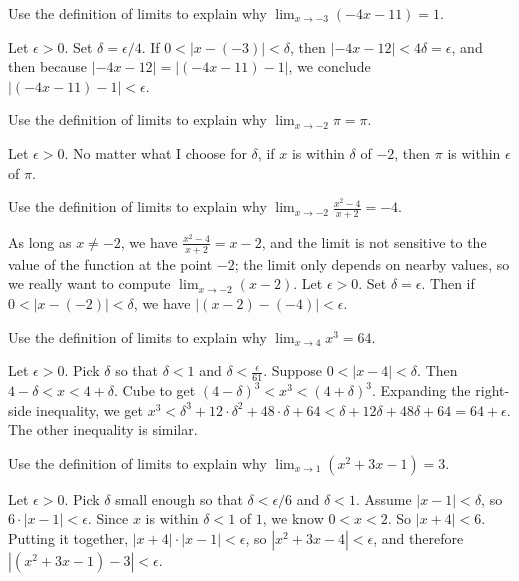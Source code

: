 \begin{exercises}
\begin{exercise} 
Use the definition of limits to explain why $\lim_{x\to -3} (-4x-11)
= 1$.
\begin{answer}
  Let $\epsilon > 0$.  Set $\delta = \epsilon/4$.  If $0 < |x - (-3)| < \delta$, then $|-4x - 12| < 4 \delta = \epsilon$, and then because $|-4x - 12| = |(-4x - 11) - 1|$, we conclude $|(-4x - 11) - 1| < \epsilon$.
\end{answer}
\end{exercise}

\begin{exercise} 
Use the definition of limits to explain why $\lim_{x\to -2} \pi = \pi$.
\begin{answer}
  Let $\epsilon > 0$.  No matter what I choose for $\delta$, if $x$ is within $\delta$ of $-2$, then $\pi$ is within $\epsilon$ of $\pi$.
\end{answer}
\end{exercise}

\begin{exercise} 
Use the definition of limits to explain why $\lim_{x\to -2} \frac{x^2-4}{x+2} = -4$.
\begin{answer}
  As long as $x \neq -2$, we have $\frac{x^2-4}{x+2} = x-2$, and the limit is not sensitive to the value of the function at the point $-2$; the limit only depends on nearby values, so we really want to compute $\lim_{x \to -2} (x-2)$.  Let $\epsilon > 0$.  Set $\delta = \epsilon$.  Then if $0 < |x - (-2)| < \delta$, we have $|(x - 2) - (-4)| < \epsilon$.
\end{answer}
\end{exercise}

\begin{exercise} 
Use the definition of limits to explain why $\lim_{x\to 4} x^3 = 64$.
\begin{answer}
  Let $\epsilon > 0$.   Pick $\delta$ so that $\delta < 1$ and $\delta < \frac{\epsilon}{61}$.  Suppose $0 < |x-4| < \delta$.  Then $4 - \delta < x < 4 + \delta$.  Cube to get $\left( 4 - \delta \right)^3 < x^3 < \left( 4 + \delta \right)^3$.  Expanding the right-side inequality, we get $x^3 < \delta^3 + 12\cdot\delta^2 + 48\cdot\delta + 64 < \delta + 12 \delta + 48 \delta + 64 = 64 + \epsilon$.  The other inequality is similar.
\end{answer}
\end{exercise}

\begin{exercise} 
Use the definition of limits to explain why $\lim_{x\to 1} (x^2+3x-1) = 3$.
\begin{answer}
  Let $\epsilon > 0$.  Pick $\delta$ small enough so that $\delta < \epsilon / 6$ and $\delta < 1$.  Assume $|x - 1| < \delta$, so $6 \cdot |x - 1| < \epsilon$.  Since $x$ is within $\delta < 1$ of $1$, we know $0 < x < 2$.  So $|x+4| < 6$.  Putting it together, $|x+4| \cdot |x-1| < \epsilon$, so $|x^2 + 3x - 4| < \epsilon$, and therefore $|(x^2 + 3x - 1) - 3| < \epsilon$.
\end{answer}
\end{exercise}



\end{exercises}
